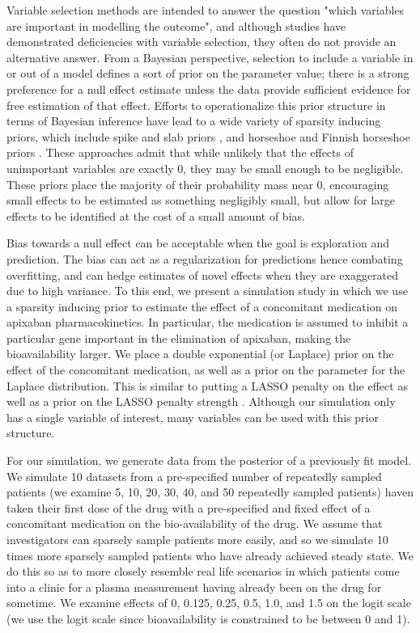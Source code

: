 Variable selection methods are intended to answer the question "which variables are important in modelling the outcome", and although studies have demonstrated deficiencies with variable selection, they often do not provide an alternative answer.  From a Bayesian perspective, selection to include a variable in or out of a model defines a sort of prior on the parameter value; there is a strong preference for a null effect estimate unless the data provide sufficient evidence for free estimation of that effect.  Efforts to operationalize this prior structure in terms of Bayesian inference have lead to a wide variety of sparsity inducing priors, which include spike and slab priors \cite{mitchell1988bayesian}, and horseshoe \cite{carvalho2010horseshoe} and Finnish horseshoe priors \cite{piironen2017sparsity}. These approaches admit that while unlikely that the effects of unimportant variables are exactly 0, they may be small enough to be negligible.  These priors place the majority of their probability mass near 0, encouraging small effects to be estimated as something negligibly small, but allow for large effects to be identified at the cost of a small amount of bias.

Bias towards a null effect  can be acceptable when the goal is exploration and prediction.  The bias can act as a regularization for predictions hence combating overfitting, and can hedge estimates of novel effects when they are exaggerated due to high variance. To this end, we present a simulation study in which we use a sparsity inducing prior to estimate the effect of a concomitant medication on apixaban pharmacokinetics.  In particular, the medication is assumed to inhibit a particular gene important in the elimination of apixaban, making the bioavailability larger.  We place a double exponential (or Laplace) prior on the effect of the concomitant medication, as well as a prior on the parameter for the Laplace distribution.  This is similar to putting a LASSO penalty on the effect as well as a prior on the LASSO penalty strength \cite{tibshirani1996regression}.  Although our simulation only has a single variable of interest, many variables can be used with this prior structure.

For our simulation, we generate data from the posterior of a previously fit model. We simulate 10 datasets from a pre-specified number of repeatedly sampled patients (we examine 5, 10, 20, 30, 40, and 50 repeatedly sampled patients) haven taken their first dose of the drug with a pre-specified and fixed effect of a concomitant medication on the bio-availability of the drug.  We assume that investigators can sparsely sample patients more easily, and so we simulate 10 times more sparsely sampled patients who have already achieved steady state. We do this so as to more closely resemble real life scenarios in which patients come into a clinic for a plasma measurement having already been on the drug for sometime. We examine effects of 0, 0.125, 0.25, 0.5, 1.0, and 1.5 on the logit scale (we use the logit scale since bioavailability is constrained to be between 0 and 1). 

